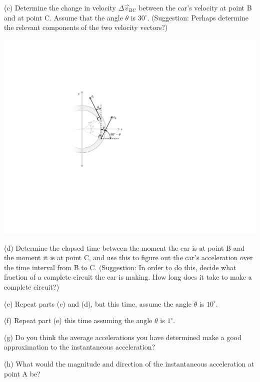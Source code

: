 \vfil\eject

(c) Determine the change in velocity $\Delta {\vec v}_\mathrm{BC}$ between the
car's velocity at point B and at point C.  Assume that the angle $\theta$
is $30^\circ$.  (Suggestion: Perhaps determine the relevant
components of the two velocity vectors?)

\includegraphics{vectors/vectors_fig2.pdf}

(d) Determine the elapsed time between the moment the car is at
point B and the moment it is at point C, and use this to figure out
the car's acceleration over the time interval from B to C.
(Suggestion: In order to do this, decide what fraction of a complete
circuit the car is making.  How long does it take to make a complete circuit?)

\vfil\eject

(e) Repeat parts (c) and (d), but this time, assume the angle $\theta$ is 
$10^\circ$.

\vfil

(f) Repeat part (e) this time assuming the angle $\theta$ is 
$1^\circ$.

\vfil

(g) Do you think the average accelerations you have determined make a good
approximation to the instantaneous acceleration?

\vskip 0.8in

(h) What would the magnitude and direction of the instantaneous acceleration
at point A be?

\vskip 0.8in\eject

